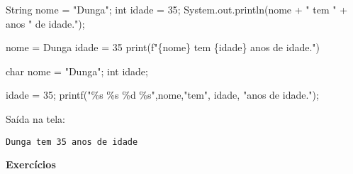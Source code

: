 \documentclass[
  letterpaper,
  DIV=11,
  numbers=noendperiod]{scrreprt}
\newenvironment{Shaded}{\begin{snugshade}}{\end{snugshade}}
\newcommand{\AttributeTok}[1]{\textcolor[rgb]{0.40,0.45,0.13}{#1}}
\newcommand{\BuiltInTok}[1]{\textcolor[rgb]{0.00,0.23,0.31}{#1}}
\newcommand{\DataTypeTok}[1]{\textcolor[rgb]{0.68,0.00,0.00}{#1}}
\newcommand{\DecValTok}[1]{\textcolor[rgb]{0.68,0.00,0.00}{#1}}
\newcommand{\FunctionTok}[1]{\textcolor[rgb]{0.28,0.35,0.67}{#1}}
\newcommand{\NormalTok}[1]{\textcolor[rgb]{0.00,0.23,0.31}{#1}}
\newcommand{\OperatorTok}[1]{\textcolor[rgb]{0.37,0.37,0.37}{#1}}
\newcommand{\SpecialCharTok}[1]{\textcolor[rgb]{0.37,0.37,0.37}{#1}}
\newcommand{\SpecialStringTok}[1]{\textcolor[rgb]{0.13,0.47,0.30}{#1}}
\newcommand{\StringTok}[1]{\textcolor[rgb]{0.13,0.47,0.30}{#1}}
\begin{document}
\begin{Shaded}
\begin{Highlighting}[]
\BuiltInTok{String}\NormalTok{ nome }\OperatorTok{=} \StringTok{"Dunga"}\OperatorTok{;}
\NormalTok{int idade }\OperatorTok{=} \DecValTok{35}\OperatorTok{;}
\NormalTok{System}\OperatorTok{.}\AttributeTok{out}\OperatorTok{.}\FunctionTok{println}\NormalTok{(nome }\OperatorTok{+} \StringTok{" tem "} \OperatorTok{+}\NormalTok{ anos }\StringTok{" de idade."}\NormalTok{)}\OperatorTok{;}
\end{Highlighting}
\end{Shaded}

\begin{Shaded}
\begin{Highlighting}[]
\NormalTok{nome }\OperatorTok{=}\NormalTok{ Dunga}
\NormalTok{idade }\OperatorTok{=} \DecValTok{35}
\BuiltInTok{print}\NormalTok{(}\SpecialStringTok{f"}\SpecialCharTok{\{}\NormalTok{nome}\SpecialCharTok{\}}\SpecialStringTok{ tem }\SpecialCharTok{\{}\NormalTok{idade}\SpecialCharTok{\}}\SpecialStringTok{ anos de idade."}\NormalTok{)}
\end{Highlighting}
\end{Shaded}

\begin{Shaded}
\begin{Highlighting}[]
\DataTypeTok{char}\NormalTok{ nome }\OperatorTok{=} \StringTok{"Dunga"}\OperatorTok{;}
\DataTypeTok{int}\NormalTok{ idade}\OperatorTok{;}

\NormalTok{idade }\OperatorTok{=} \DecValTok{35}\OperatorTok{;}
\NormalTok{printf}\OperatorTok{(}\StringTok{"}\SpecialCharTok{\%s}\StringTok{ }\SpecialCharTok{\%s}\StringTok{ }\SpecialCharTok{\%d}\StringTok{ }\SpecialCharTok{\%s}\StringTok{"}\OperatorTok{,}\NormalTok{nome}\OperatorTok{,}\StringTok{"tem"}\OperatorTok{,}\NormalTok{ idade}\OperatorTok{,} \StringTok{"anos de idade."}\OperatorTok{);}
\end{Highlighting}
\end{Shaded}

Saída na tela:

\begin{verbatim}
Dunga tem 35 anos de idade
\end{verbatim}

\textbf{Exercícios}
\end{document}
